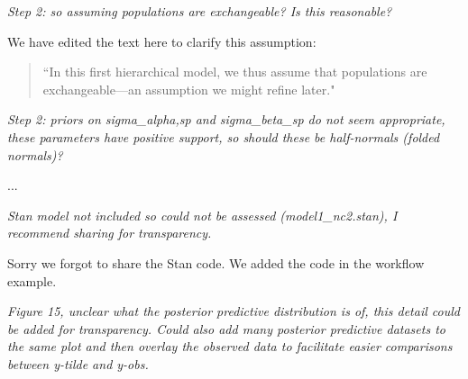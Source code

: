 \documentclass[11pt,letter]{article}
\begin{document}
\begin{mybox}
\emph{Step 2: so assuming populations are exchangeable? Is this reasonable?}
\end{mybox}

We have edited the text here to clarify this assumption:
\begin{quote}
``In this first hierarchical model, we thus assume that populations are exchangeable---an assumption we might refine later."
\end{quote}


\begin{mybox}
\emph{Step 2: priors on sigma\_alpha,sp and sigma\_beta\_sp do not seem
appropriate, these parameters have positive support, so should these be
half-normals (folded normals)?}
\end{mybox}

...

\begin{mybox}
\emph{Stan model not included so could not be assessed (model1\_nc2.stan), I
recommend sharing for transparency.}
\end{mybox}

Sorry we forgot to share the Stan code. We added the code in the workflow example.

\begin{mybox}
\emph{Figure 15, unclear what the posterior predictive distribution is of,
this detail could be added for transparency. Could also add many
posterior predictive datasets to the same plot and then overlay the
observed data to facilitate easier comparisons between y-tilde and y-obs.}
\end{mybox}

\end{document}
